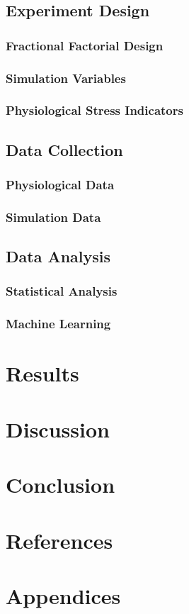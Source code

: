 \documentclass[12pt]{article}
\begin{document}
\subsection{Experiment Design}

\subsubsection{Fractional Factorial Design}



\subsubsection{Simulation Variables}

\subsubsection{Physiological Stress Indicators}

\subsection{Data Collection}

\subsubsection{Physiological Data}

\subsubsection{Simulation Data}

\subsection{Data Analysis}

\subsubsection{Statistical Analysis}

\subsubsection{Machine Learning}

\section{Results}

\section{Discussion}

\section{Conclusion}

\section{References}




\section{Appendices}
\end{document}
